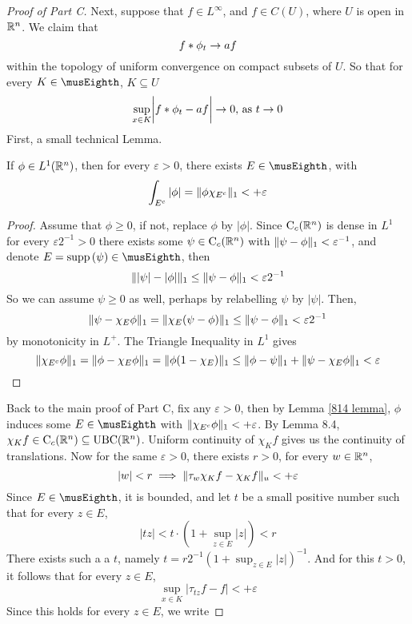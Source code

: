 \documentclass[../../main.tex]{subfiles}
\begin{document}
\begin{proof}[Proof of Part C]
    Next, suppose that $f\in L^\infty$, and $f\in C(U)$, where $U$ is open in $\mathbb{R}^n$. We claim that 
    \[f\ast \phi_t\to af\]
    within the topology of uniform convergence on compact subsets of $U$. So that for every $K\in\cpt$, $K\subseteq U$\[\sup_{x\in K}\biggl|f\ast\phi_t-af\biggr|\to 0,\,\text{as }t\to 0\]
    First, a small technical Lemma.
    \begin{lemma}\label{814 lemma}
        If $\phi\in L^1({\mathbb{R}^n})$, then for every $\varepsilon>0$, there exists $E\in\cpt$, with
        \[\int_{E^c}|\phi|=\lVert {\phi\chi_{E^c}} \rVert_1<+\varepsilon\]
    \end{lemma}
    \begin{proof}
        Assume that $\phi\geq 0$, if not, replace $\phi$ by $|\phi|$. Since $\operatorname{C}_c({{\mathbb{R}^n}})$ is dense in $L^1$ for every $\varepsilon2^{-1}>0$ there exists some $\psi\in\operatorname{C}_c({{\mathbb{R}^n}})$ with $\lVert {\psi-\phi} \rVert_1<\varepsilon^{-1}$, and denote $E=\supp{\psi}\in\cpt$, then
        \[\lVert {|\psi|-|\phi|} \rVert_1\leq\lVert {\psi-\phi} \rVert_1<\varepsilon2^{-1}\]
        So we can assume $\psi\geq 0$ as well, perhaps by relabelling $\psi$ by $|\psi|$. Then,
        \[\lVert {\psi-\chi_E\phi} \rVert_1=\lVert {\chi_E(\psi-\phi)} \rVert_1\leq\lVert {\psi-\phi} \rVert_1<\varepsilon2^{-1}\]
        by monotonicity in $L^+$. The Triangle Inequality in $L^1$ gives
        \[\lVert {\chi_{E^c}\phi} \rVert_1=\lVert {\phi-\chi_E\phi} \rVert_1=\lVert {\phi(1-\chi_E)} \rVert_1\leq \lVert {\phi - \psi} \rVert_1 + \lVert {\psi - \chi_{E}\phi} \rVert_1<\varepsilon\]
    \end{proof}
        Back to the main proof of Part C, fix any $\varepsilon>0$, then by Lemma \ref{814 lemma}, $\phi$ induces some $E\in\cpt$ with $\lVert {\chi_{E^c}\phi} \rVert_1<+\varepsilon$. By Lemma 8.4, $\chi_Kf\in \operatorname{C}_c({{\mathbb{R}^n}})\subseteq\operatorname{UBC}(\mathbb{R}^n)$. Uniform continuity of $\chi_Kf$ gives us the continuity of translations. Now for the same $\varepsilon>0$, there exists $r>0$, for every $w\in{\mathbb{R}^n}$,
        \begin{equation}\label{814 condition 1}
            |w|<r\implies\lVert {\tau_w\chi_Kf-\chi_Kf} \rVert_u<+\varepsilon
        \end{equation}
        Since $E\in\cpt$, it is bounded, and let $t$ be a small positive number such that for every $z\in E$,
        \[|tz|<t\cdot(1+\sup_{z\in E}|z|)<r\]
        There exists such a a $t$, namely $t = r2^{-1}(1+\sup_{z\in E}|z|)^{-1}$. And for this $t>0$, it follows that for every $z\in E$, \[\sup_{x\in K}\left|\tau_{tz}f-f\right|<+\varepsilon\]
        Since this holds for every $z\in E$, we write

\end{proof}
\end{document}
